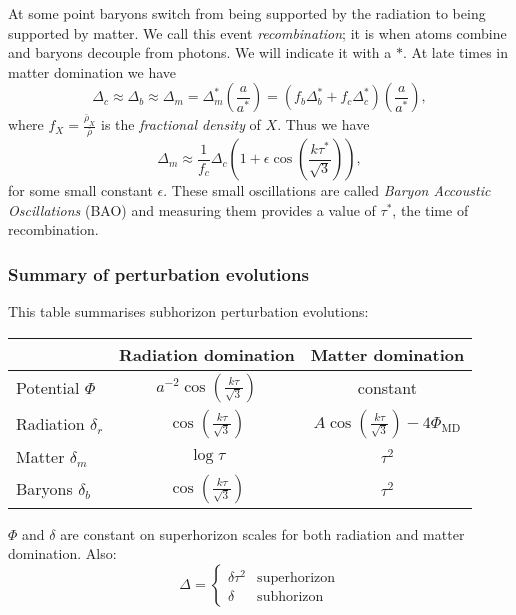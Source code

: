 \documentclass{jknotes}
\begin{document}
At some point baryons switch from being supported by the radiation to being supported by matter. We call this event \emph{recombination}; it is when atoms combine and baryons decouple from photons. We will indicate it with a \(*\). At late times in matter domination we have
\begin{equation}
    \Delta_c \approx \Delta_b \approx \Delta_m = \Delta^*_m\left(\frac{a}{a^*}\right) = \left(f_b\Delta_b^* + f_c\Delta_c^*\right)\left(\frac{a}{a^*}\right),
\end{equation}
where \(f_X = \frac{\bar{\rho}_X}{\bar{\rho}}\) is the \emph{fractional density} of \(X\). Thus we have
\begin{equation}
    \Delta_m \approx \frac{1}{f_c}\Delta_c\left(1+\epsilon\cos\left(\frac{k\tau^*}{\sqrt{3}}\right)\right),
\end{equation}
for some small constant \(\epsilon\). These small oscillations are called \emph{Baryon Accoustic Oscillations} (BAO) and measuring them provides a value of \(\tau^*\), the time of recombination.

\subsubsection*{Summary of perturbation evolutions}
This table summarises subhorizon perturbation evolutions:
\begin{table}[H]
    \centering
    \begin{tabular}{lcc}
        \toprule
        & Radiation domination & Matter domination \\
        \midrule
        Potential \(\Phi\) & \(a^{-2}\cos(\frac{k\tau}{\sqrt3})\) & constant \\
        Radiation \(\delta_r\) & \(\cos(\frac{k\tau}{\sqrt3})\) & \(A\cos(\frac{k\tau}{\sqrt3})-4\Phi_{\text{MD}}\) \\
        Matter \(\delta_m\) & \(\log \tau\) & \(\tau^2\) \\
        Baryons \(\delta_b\) & \(\cos(\frac{k\tau}{\sqrt3})\) & \(\tau^2\) \\
        \bottomrule
    \end{tabular}
\end{table}
\(\Phi\) and \(\delta\) are constant on superhorizon scales for both radiation and matter domination. Also:
\begin{equation}
    \Delta = 
    \begin{cases}
        \delta \tau^2 & \text{superhorizon} \\
        \delta & \text{subhorizon}
    \end{cases}
\end{equation}
\end{document}
